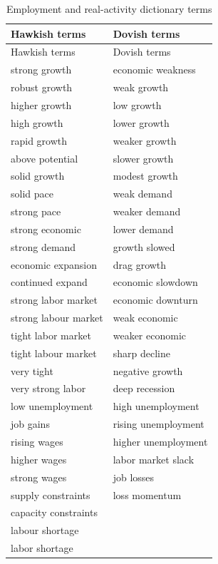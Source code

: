 \begin{longtable}{p{}p{}}
\caption{Employment and real-activity dictionary terms}\label{tab:a1_employment_terms}\\
\toprule
Hawkish terms & Dovish terms \\
\midrule
\endfirsthead
\toprule
Hawkish terms & Dovish terms \\
\midrule
\endhead
strong growth & economic weakness \\
robust growth & weak growth \\
higher growth & low growth \\
high growth & lower growth \\
rapid growth & weaker growth \\
above potential & slower growth \\
solid growth & modest growth \\
solid pace & weak demand \\
strong pace & weaker demand \\
strong economic & lower demand \\
strong demand & growth slowed \\
economic expansion & drag growth \\
continued expand & economic slowdown \\
strong labor market & economic downturn \\
strong labour market & weak economic \\
tight labor market & weaker economic \\
tight labour market & sharp decline \\
very tight & negative growth \\
very strong labor & deep recession \\
low unemployment & high unemployment \\
job gains & rising unemployment \\
rising wages & higher unemployment \\
higher wages & labor market slack \\
strong wages & job losses \\
supply constraints & loss momentum \\
capacity constraints &  \\
labour shortage &  \\
labor shortage &  \\
\bottomrule
\end{longtable}

